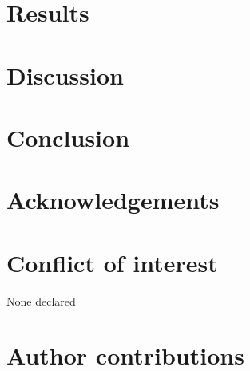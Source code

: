 \clearpage

\section*{Results}
\label{sec:results1}

\clearpage

\section*{Discussion}
\label{sec:discu1}

\section*{Conclusion}
\label{sec:conclu1}

\section*{Acknowledgements}
\label{sec:acknowl1}

\section*{Conflict of interest}
\label{sec:conflict1}

None declared

\section*{Author contributions}
\label{sec:author1}

\cleardoublepage


\begin{otherlanguage}{english}


\end{otherlanguage}
